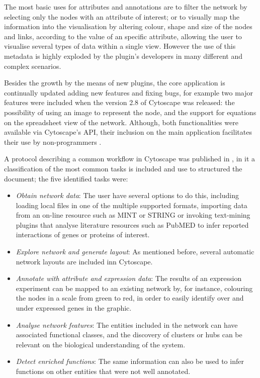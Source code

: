 The most basic uses for attributes and annotations are to filter the network by selecting only the nodes with an attribute of interest; or to visually map the information into the visualisation by altering colour, shape and size of the nodes and links, according to the value of an specific attribute, allowing the user to visualise several types of data within a single view. However the use of this metadata is highly exploded by the plugin's developers in many different and complex scenarios.

Besides the growth by the means of new plugins, the core application is continually updated adding new features and fixing bugs, for example two major features were included when the version 2.8 of Cytoscape was released: the possibility of using an image to represent the node, and the support for equations on the spreadsheet view of the network. Although, both functionalities were available via Cytoscape's API, their inclusion on the main application facilitates their use by non-programmers \cite{SMO2011}.

A protocol describing a common workflow in Cytoscape was published in \cite{CLI2007}, in it a classification of the most common tasks is included and use to structured the document; the five identified tasks were: 
\begin{itemize}
\setlength\itemsep{-0.3em}
	\item \emph{Obtain network data}: The user have several options to do this, including loading local files in one of the multiple supported formats, importing data from an on-line resource such as MINT or STRING or invoking text-mining plugins that analyse literature resources such as PubMED to infer reported interactions of genes or proteins of interest.
	\item \emph{Explore network and generate layout}: As mentioned before, several automatic network layouts are included inn Cytoscape.
	\item \emph{Annotate with attribute and expression data}: The results of an expression experiment can be mapped to an existing network by, for instance, colouring the nodes in a scale from green to red, in order to easily identify over and under expressed genes in the graphic.
	\item \emph{Analyse network features}: The entities included in the network can have associated functional classes, and the discovery of clusters or hubs can be relevant on the biological understanding of the  system.
	\item \emph{Detect enriched functions}: The same information can also be used to infer functions on other entities that were not well annotated.
\end{itemize}

